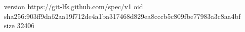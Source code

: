 version https://git-lfs.github.com/spec/v1
oid sha256:903ff9da62aa19f712de4a1ba317468d829ea8cccb5c809fbe77983a3c8aa4bf
size 32406
